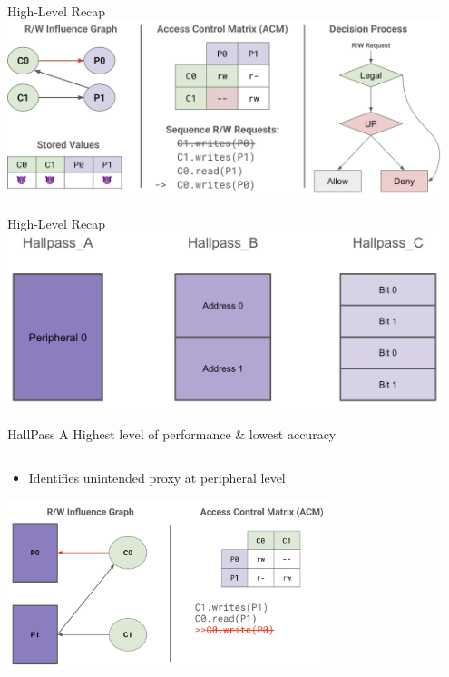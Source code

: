 \begin{frame}{High-Level Recap}
    \centering
    \includegraphics[height=0.95\textheight,width=0.95\textwidth,keepaspectratio]{images/hallpass_a.png}
\end{frame}

\begin{frame}{High-Level Recap}
    \centering
    \includegraphics[height=0.95\textheight,width=0.95\textwidth,keepaspectratio]{images/intro.png}
\end{frame}

\begin{frame}{HallPass A}
    Highest level of performance \& lowest accuracy
    \begin{columns}
        \begin{column}{0.5\textwidth}
            \begin{itemize}
                \item Identifies unintended proxy at peripheral level
            \end{itemize}
            \centering
            \includegraphics[height=0.7\textheight,width=0.7\textwidth,keepaspectratio]{images/hallpass_a_acm.png}
        \end{column}
    \end{columns}
\end{frame}

